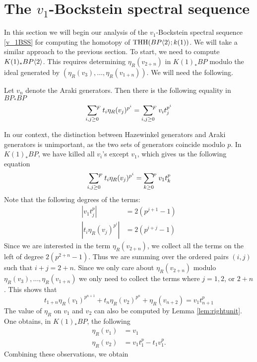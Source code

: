 
\section{The $v_1$-Bockstein spectral sequence}

In this section we will begin our analysis of the $v_1$-Bockstein spectral sequence \eqref{v_1BSS} for computing the homotopy of $\operatorname{THH}(BP\langle 2 \rangle;k(1))$. We will take a similar approach to the previous section.
To start, we need to compute $K(1)_*BP\langle 2 \rangle$. This requires determining $\eta_R(v_{2+n})$ in $K(1)_*BP$ modulo the ideal generated by $(\eta_R(v_3), \ldots, \eta_R(v_{1+n}))$. We will need the following. 

\begin{lem}\label{lem:rightunit}{\cite[Lemma A.2.2.5]{greenbook}} Let $v_n$ denote the Araki generators. Then there is the following equality in $BP_*BP$
\[
\sum_{i,j\geq 0}\hspace{-5pt}\mbox{}^F\: t_i\eta_R(v_j)^{p^i}=\sum_{i,j\geq 0}\hspace{-5pt}\mbox{}^F\:v_it_j^{p^i}
\]
\end{lem}

In our context, the distinction between Hazewinkel generators and Araki generators is unimportant, as the two sets of generators coincide modulo $p$. In $K(1)_*BP$, we have killed all $v_i$'s except $v_1$, which gives us the following equation
\[
\sum_{i,j\geq 0}\hspace{-5pt}\mbox{}^F\: t_i\eta_R(v_j)^{p^i}=\sum_{k\geq 0}\hspace{-4pt}\mbox{}^F\:v_1t_k^{p}
\]
Note that the following degrees of the terms:
\begin{align*}
	|v_1t_j^p|&= 2(p^{j+1}-1)\\
	|t_i\eta_R(v_j)^{p^i}|&= 2(p^{i+j}-1)
\end{align*}
Since we are interested in the term $\eta_R(v_{2+n})$, we collect all the terms on the left of degree $2(p^{2+n}-1)$. Thus we are summing over the ordered pairs $(i,j)$ such that $i+j=2+n$. Since we only care about $\eta_R(v_{2+n})$ modulo $\eta_R(v_3), \ldots, \eta_R(v_{1+n})$ we only need to collect the terms where $j=1, 2$, or $2+n$. This shows that 
\[
t_{1+n}\eta_R(v_1)^{p^{n+1}}+t_n\eta_R(v_2)^{p^n}+\eta_R(v_{n+2})=v_1t_{n+1}^p
\]
The value of $\eta_R$ on $v_1$ and $v_2$ can also be computed by Lemma \ref{lem:rightunit}. One obtains, in $K(1)_*BP$, the following
\begin{align*}
\eta_R(v_1)&=v_1\\
\eta_R(v_2)&=v_1t_1^p-t_1v_1^p.
\end{align*}
Combining these observations, we obtain

